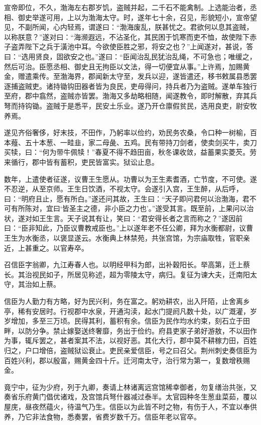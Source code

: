 \documentclass[]{article}
\begin{document}
宣帝即位，不久，渤海左右郡岁饥，盗贼并起，二千石不能禽制。上选能治者，丞相、御史举遂可用，上以为渤海太守。时，遂年七十余，召见，形貌短小，宣帝望见，不副所闻，心内轻焉，谓遂曰：``渤海废乱，朕甚忧之。君欲何以息其盗贼，以称朕意？''遂对曰：``海濒遐远，不沾圣化，其民困于饥寒而吏不恤，故使陛下赤子盗弄陛下之兵于潢池中耳。今欲使臣胜之邪，将安之也？''上闻遂对，甚说，答曰：``选用贤良，固欲安之也。''遂曰：``臣闻治乱民犹治乱绳，不可急也；唯缓之，然后可治。臣愿丞相、御史且无拘臣以文法，得一切便宜从事。''上许焉，加赐黄金，赠遣乘传。至渤海界，郡闻新太守至，发兵以迎，遂皆遣还，移书敕属县悉罢逐捕盗贼吏。诸持锄钩田器者皆为良民，吏毋得问，持兵者乃为盗贼。遂单车独行至府，郡中翕然，盗贼亦皆罢。渤海又多劫略相随，闻遂教令，即时解散，弃其兵弩而持钩锄。盗贼于是悉平，民安土乐业。遂乃开仓廪假贫民，选用良吏，尉安牧养焉。

遂见齐俗奢侈，好末技，不田作，乃躬率以俭约，劝民务农桑，令口种一树榆，百本薤、五十本葱、一畦韭，家二母彘、五鸡。民有带持刀剑者，使卖剑买牛，卖刀买犊，曰：``何为带牛佩犊！''春夏不得不趋田亩，秋冬课收敛，益蓄果实菱芡。劳来循行，郡中皆有蓄积，吏民皆富实。狱讼止息。

数年，上遣使者征遂，议曹王生愿从。功曹以为王生素耆酒，亡节度，不可使。遂不忍逆，从至京师。王生日饮酒，不视太守。会遂引入宫，王生醉，从后呼，曰：``明府且止，愿有所白。''遂还问其故，王生曰：``天子即问君何以治渤海，君不可有所陈对，宜曰`皆圣主之德，非小臣之力也'。''遂受其言。既至前，上果问以治状，遂对如王生言。天子说其有让，笑曰：``君安得长者之言而称之？''遂因前曰：``臣非知此，乃臣议曹教戒臣也。''上以遂年老不任公卿，拜为水衡都尉，议曹王生为水衡丞，以褒显遂云。水衡典上林禁苑，共张宫馆，为宗庙取牲，官职亲近，上甚重之。以官寿卒。

召信臣字翁卿，九江寿春人也。以明经甲科为郎，出补穀阳长。举高第，迁上蔡长。其治视民如子，所居见称述，超为零陵太守，病归。复征为谏大夫，迁南阳太守，其治如上蔡。

信臣为人勤力有方略，好为民兴利，务在富之。躬劝耕农，出入阡陌，止舍离乡亭，稀有安居时。行视郡中水泉，开通沟渎，起水门提阏凡数十处，以广溉灌，岁岁增加，多至三万顷。民得其利，蓄积有余。信臣为民作均水约束，刻石立于田畔，以防分争。禁止嫁娶送终奢靡，务出于俭约。府县吏家子弟好游敖，不以田作为事，辄斥罢之，甚者案其不法，以视好恶。其化大行，郡中莫不耕稼力田，百姓归之，户口增倍，盗贼狱讼衰止。吏民亲爱信臣，号之曰召父。荆州刺史奏信臣为百姓兴利，郡以殷富，赐黄金四十斤。迁河南太守，治行常为第一，复数增秩赐金。

竟宁中，征为少府，列于九卿，奏请上林诸离远宫馆稀幸御者，勿复缮治共张，又奏省乐府黄门倡优诸戏，及宫馆兵弩什器减过泰半。太官园种冬生葱韭菜茹，覆以屋庑，昼夜然蕴火，待温气乃生。信臣以为此皆不时之物，有伤于人，不宜以奉供养，乃它非法食物，悉奏罢，省费岁数千万。信臣年老以官卒。
\end{document}
